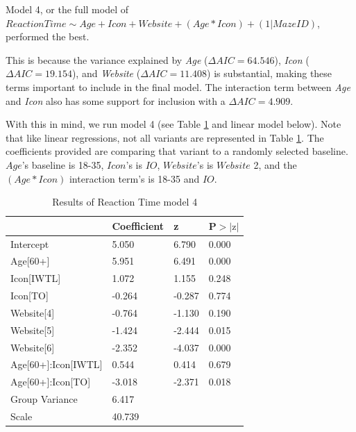 \documentclass[12pt,twoside]{reedthesis}
\begin{document}
    Model 4, or the full model of $ReactionTime\sim Age + Icon + Website + (Age* Icon)+(1|MazeID)$, performed the best. 

    This is because the variance explained by \textit{Age} ($\Delta AIC=64.546$), \textit{Icon} ($\Delta AIC=19.154$), and \textit{Website} ($\Delta AIC=11.408$) is substantial, making these terms important to include in the final model. The interaction term between \textit{Age} and \textit{Icon} also has some support for inclusion with a $\Delta AIC=4.909$.

    With this in mind, we run model 4 (see Table \ref{no_w1_w3_m4} and linear model below). Note that like linear regressions, not all variants are represented in Table \ref{no_w1_w3_m4}. The coefficients provided are comparing that variant to a randomly selected baseline. $Age$'s baseline is 18-35, $Icon$'s is $IO$, $Website$'s is $Website$ 2, and the $(Age*Icon)$ interaction term's is 18-35 and $IO$. 

    \begin{table}[H]
        \centering
        \begin{tabular}{| p{5cm} | p{2.5cm} | p{2.5cm} | p{2.5cm} |}
            \hline
            & Coefficient & z & P$>|\text{z}|$\\
            \hline
            Intercept & 5.050 & 6.790 & 0.000\\
            \hline
            Age[60+] & 5.951 & 6.491 & 0.000\\
            \hline
            Icon[IWTL] & 1.072 & 1.155 & 0.248\\
            \hline
            Icon[TO] & -0.264 & -0.287 & 0.774\\
            \hline
            Website[4] & -0.764 & -1.130 & 0.190\\
            \hline
            Website[5] & -1.424 & -2.444 & 0.015\\
            \hline
            Website[6] & -2.352 & -4.037 & 0.000\\
            \hline
            Age[60+]:Icon[IWTL] & 0.544 & 0.414 & 0.679\\
            \hline
            Age[60+]:Icon[TO] & -3.018 & -2.371 & 0.018\\
            \hline
            Group Variance & 6.417 &&\\
            \hline
            Scale & 40.739 &&\\
            \hline
        \end{tabular}
        \caption{Results of Reaction Time model 4}
        \label{no_w1_w3_m4}
    \end{table}
\end{document}
